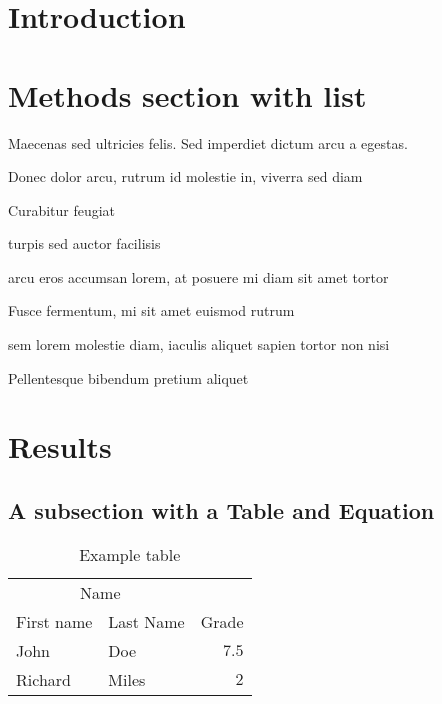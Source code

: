 \documentclass{is2014}
\begin{document}
\begin{multicols}{2} %

\section{Introduction}

\lipsum[2-3] %


\section{Methods section with list}

Maecenas sed ultricies felis. Sed imperdiet dictum arcu a egestas. 
\begin{compactitem}
\item Donec dolor arcu, rutrum id molestie in, viverra sed diam
\item Curabitur feugiat
\item turpis sed auctor facilisis
\item arcu eros accumsan lorem, at posuere mi diam sit amet tortor
\item Fusce fermentum, mi sit amet euismod rutrum
\item sem lorem molestie diam, iaculis aliquet sapien tortor non nisi
\item Pellentesque bibendum pretium aliquet
\end{compactitem}
\lipsum[4] %


\section{Results}

\subsection{A subsection with a Table and Equation}

\begin{table}[H]
\caption{Example table}
\centering
\begin{tabular}{llr}
\toprule
\multicolumn{2}{c}{Name} \\
\cmidrule(r){1-2}
First name & Last Name & Grade \\
\midrule
John & Doe & $7.5$ \\
Richard & Miles & $2$ \\
\bottomrule
\end{tabular}
\end{table}


\end{multicols}
\end{document}
